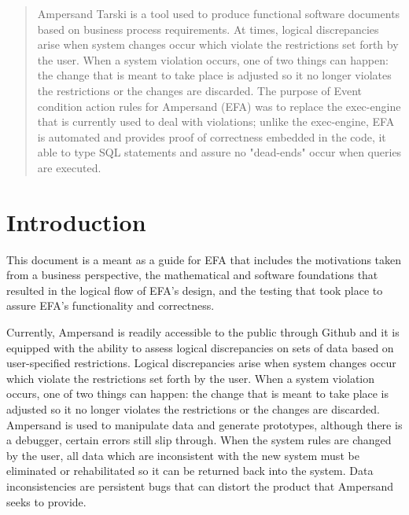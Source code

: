 \documentclass[journal,12pt,onecolumn,draftclsnofoot]{article}
\begin{document}

\newpage


\begin{abstract}
Ampersand Tarski is a tool used to produce functional software documents based 
on business process requirements. At times, logical 
discrepancies arise when system changes occur which violate the 
restrictions set forth by the user. When a system violation occurs, one of two 
things can happen: the change that is meant to take place is adjusted so it no 
longer violates the restrictions or the changes are discarded. The purpose of 
Event condition action rules for Ampersand (EFA) was to replace the exec-engine 
that is currently used to deal with violations; unlike the exec-engine, EFA is 
automated and provides proof of correctness embedded in the code, it able to 
type SQL statements and assure no "dead-ends" occur when queries are executed.
\end{abstract}
\newpage
\tableofcontents
\newpage
\newpage
\section{Introduction}\label{Intro}

This document is a meant as a guide for EFA that includes the motivations taken 
from a business perspective, the mathematical and software foundations that 
resulted in the logical flow of EFA's design, and the testing that took place 
to assure EFA's functionality and correctness.

Currently, Ampersand is readily accessible to the public through Github and it 
is equipped with the ability to assess logical 
discrepancies on sets of data based on user-specified restrictions. Logical 
discrepancies arise when system changes occur which violate the 
restrictions set forth by the user. When a system violation occurs, one of two 
things can happen: the change that is meant to take place is adjusted so it no 
longer violates the restrictions or the changes are discarded. Ampersand is 
used to manipulate data and generate prototypes, although there is a debugger, 
certain errors still slip through. When the system rules are changed by the 
user, all data which are inconsistent with the new system must be eliminated or 
rehabilitated so it can be returned back into the system. Data inconsistencies 
are persistent bugs that can distort the product that Ampersand seeks to 
provide. 
\end{document}
